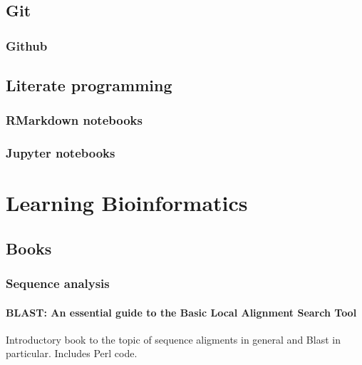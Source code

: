 \documentclass[]{book}
\theoremstyle{definition}
\theoremstyle{definition}
\theoremstyle{definition}
\theoremstyle{remark}
\begin{document}
\section{Git}\label{git}

\subsection{Github}\label{github}

\section{Literate programming}\label{literate-programming}

\subsection{RMarkdown notebooks}\label{rmarkdown-notebooks}

\subsection{Jupyter notebooks}\label{jupyter-notebooks}

\chapter{Learning Bioinformatics}\label{learning-bioinformatics}

\section{Books}\label{books}

\subsection{Sequence analysis}\label{sequence-analysis-1}

\hypertarget{blast-an-essential-guide-to-the-basic-local-alignment-search-tool}{\subsubsection*{BLAST:
An essential guide to the Basic Local Alignment Search
Tool}\label{blast-an-essential-guide-to-the-basic-local-alignment-search-tool}}

Introductory book to the topic of sequence aligments in general and
Blast in particular. Includes Perl code.
\end{document}

